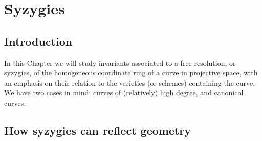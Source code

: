 

\chapter{Syzygies}
\label{SyzygiesChapter}


%
%
%
%
%
%
%
%
\def\length{{\rm length}}
\section{Introduction} 

%
%

In this Chapter we will study  invariants associated to a free resolution, or syzygies, of the homogeneous coordinate ring of a curve in projective space, with an emphasis on their relation to the varieties (or schemes) containing the curve. We have two cases in mind: curves of  (relatively) high degree, and canonical curves.

\section{How syzygies can reflect geometry}\label{syzy and geom}

